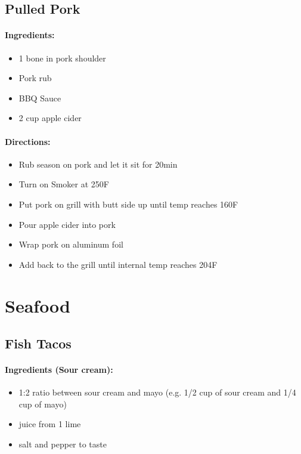 \documentclass{article}
\begin{document}
\subsection{Pulled Pork}{}

\paragraph{Ingredients:}

\begin{itemize}
	\item 1 bone in pork shoulder
	\item Pork rub
	\item BBQ Sauce
	\item 2 cup apple cider
\end{itemize}

\paragraph{Directions:}
\begin{itemize}
	\item Rub season on pork and let it sit for 20min
	\item Turn on Smoker at 250F
	\item Put pork on grill with butt side up until temp reaches 160F
	\item Pour apple cider into pork
	\item Wrap pork on aluminum foil
	\item Add back to the grill until internal temp reaches 204F
\end{itemize}

\section{Seafood}

\subsection{Fish Tacos}{}

\paragraph{Ingredients (Sour cream):}
\begin{itemize}
	\item 1:2 ratio between sour cream and mayo (e.g. 1/2 cup of sour cream and 1/4 cup of mayo)
	\item juice from 1 lime
	\item salt and pepper to taste
\end{itemize}
\end{document}
